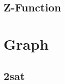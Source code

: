 \subsection{Z-Function}
\raggedbottom
\hrulefill



\section{Graph}
\subsection{2sat}
\raggedbottom
\hrulefill

